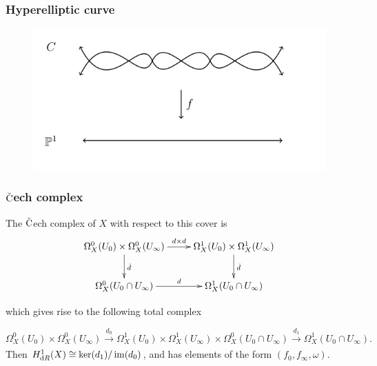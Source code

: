 \documentclass{beamer}
\begin{document}
\begin{frame}
\end{frame}

\begin{frame}
\frametitle{Hyperelliptic curve}
\begin{figure}
\includegraphics[width=0.8\linewidth]{Double_Cover.jpg}
\end{figure}
\end{frame}

\begin{frame}
\frametitle{$\check{\text C}$ech complex}
The $\check {\text C}$ech complex of $X$ with respect to this cover is
\begin{displaymath}
    \xymatrix{
        \Omega^0_X(U_0)\times \Omega_X^0(U_\infty) \ar[r]^{d \times d} \ar[d]^{\check d} & \Omega^1_X(U_0) \times \Omega_X^1(U_\infty) \ar[d]^{\check d} \\
        \Omega_X^0(U_0\cap U_\infty) \ar[r]^{d}                      & \Omega_X^1(U_0 \cap U_\infty)
    }
\end{displaymath}
\pause

which gives rise to the following total complex

\begin{equation*}
\Omega^0_X(U_0) \times \Omega_X^0(U_\infty) \xrightarrow[]{d_0} \Omega_X^1(U_0)\times \Omega_X^1(U_\infty) \times \Omega_X^0(U_0 \cap U_\infty) \xrightarrow[]{d_1} \Omega^1_X(U_0 \cap U_\infty).
\end{equation*}
\pause
Then $H^1_{\text dR}(X) \cong \operatorname{ker}(d_1)/\operatorname{im}(d_0)$, and has elements of the form $(f_0, f_\infty , \omega)$.
\end{frame}
\end{document}
